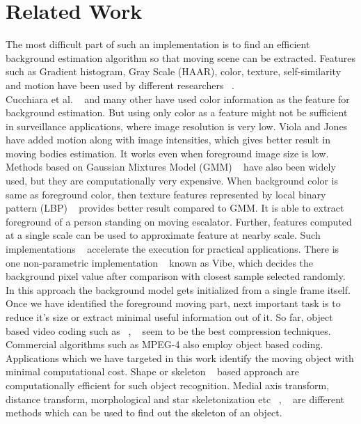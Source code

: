 \documentclass[conference]{IEEEtran}
\begin{document}
\section{Related Work}
The most difficult part of such an implementation is to find an
efficient background estimation algorithm so that moving scene can be
extracted. Features such as Gradient histogram, Gray Scale (HAAR),
color, texture, self-similarity and motion have been used by different
researchers ~\cite{13, 1, 3, 5, 6}. \\
\indent Cucchiara et al. ~\cite{1} and many other have used color
information as the feature for background estimation. But using only
color as a feature might not be sufficient in surveillance applications,
where image resolution is very low. Viola and Jones ~\cite{2} have added
motion along with image intensities, which gives better result in moving
bodies estimation. It works even when foreground image size is low.
Methods based on Gaussian Mixtures Model (GMM) ~\cite{15} have also been
widely used, but they are computationally very expensive.  When
background color is same as foreground color, then texture features
represented by local binary pattern (LBP) ~\cite{3} provides better
result compared to GMM. It is able to extract foreground of a person
standing on moving escalator. Further, features computed at a single
scale can be used to approximate feature at nearby scale. Such
implementations ~\cite{4} accelerate the execution for practical
applications. There is one non-parametric implementation ~\cite{5} known
as Vibe, which decides the background pixel value after comparison with
closest sample selected randomly. In this approach the background model
gets initialized from a single frame itself.\\
\indent Once we have identified the foreground moving part, next
important task is to reduce it's size or extract minimal useful
information out of it. So far, object based video coding such as
~\cite{7}, ~\cite{8} seem to be the best compression techniques.
Commercial algorithms such as MPEG-4 also employ object based coding.
Applications which we have targeted in this work identify the moving
object with minimal computational cost. Shape or skeleton ~\cite{11}
based approach are computationally efficient for such object
recognition. Medial axis transform, distance transform, morphological
and star skeletonization etc ~\cite{9}, ~\cite{10} are different methods
which can be used to find out the skeleton of an object.\\
\end{document}
